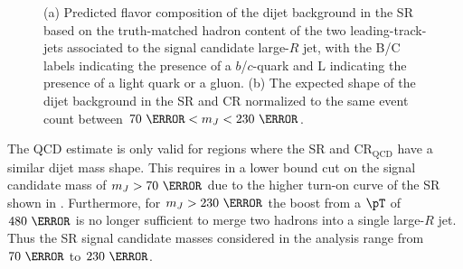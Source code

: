 \begin{figure}[!htbp]
\centering
{}\hfill
{}

\caption{\cite{ATLAS-CONF-2018-052} (a) Predicted flavor composition of the dijet background in the SR based on the truth-matched hadron content of the two leading-\pt track-jets associated to the signal candidate large-$R$ jet, with the B/C labels indicating the presence of a $b$/$c$-quark and L indicating the presence of a light quark or a gluon. (b) The expected shape of the dijet background in the SR and CR normalized to the same event count between $70~\GeV < m_{J} < 230~\GeV$.}
\label{fig:event_selection}
\end{figure}

The QCD estimate is only valid for regions where the SR and
$\text{CR}_{\text{QCD}}$ have a similar dijet mass shape.  This requires in a
lower bound cut on the signal candidate mass of $m_{J} > 70~\GeV$ due to
the higher turn-on curve of the SR shown in .
Furthermore, for $m_{J} > 230~\GeV$ the boost from a $\pT$ of $480~\GeV$ is no
longer sufficient to merge two hadrons into a single large-$R$ jet.  Thus the
SR signal candidate masses considered in the analysis range from $70~\GeV$
to $230~\GeV$.

